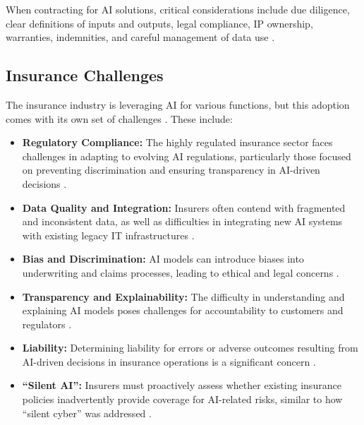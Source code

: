 When contracting for AI solutions, critical considerations include due diligence, clear definitions of inputs and outputs, legal compliance, IP ownership, warranties, indemnities, and careful management of data use \parencite{ByteBack2024}.

\subsection{Insurance Challenges}
The insurance industry is leveraging AI for various functions, but this adoption comes with its own set of challenges \parencite{Firemind2023}. These include:
\begin{itemize}
    \item \textbf{Regulatory Compliance:} The highly regulated insurance sector faces challenges in adapting to evolving AI regulations, particularly those focused on preventing discrimination and ensuring transparency in AI-driven decisions \parencite{TribeAI2023}.
    \item \textbf{Data Quality and Integration:} Insurers often contend with fragmented and inconsistent data, as well as difficulties in integrating new AI systems with existing legacy IT infrastructures \parencite{DataCamp2023Insurance}.
    \item \textbf{Bias and Discrimination:} AI models can introduce biases into underwriting and claims processes, leading to ethical and legal concerns \parencite{Kerzner2023}.
    \item \textbf{Transparency and Explainability:} The difficulty in understanding and explaining AI models poses challenges for accountability to customers and regulators \parencite{Saul2023}.
    \item \textbf{Liability:} Determining liability for errors or adverse outcomes resulting from AI-driven decisions in insurance operations is a significant concern \parencite{HSFKramer2024}.
    \item \textbf{``Silent AI'':} Insurers must proactively assess whether existing insurance policies inadvertently provide coverage for AI-related risks, similar to how ``silent cyber'' was addressed \parencite{Kerzner2023}.
\end{itemize}

